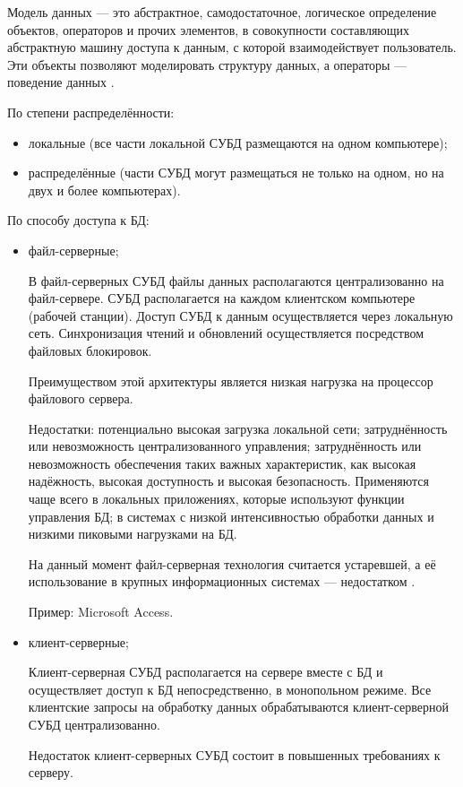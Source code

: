 Модель данных — это абстрактное, самодостаточное, логическое определение объектов, операторов и прочих элементов, в совокупности составляющих абстрактную машину доступа к данным, с которой взаимодействует пользователь. Эти объекты позволяют моделировать структуру данных, а операторы — поведение данных \cite{data_model}.

По степени распределённости:
\begin{itemize}
	\item локальные (все части локальной СУБД размещаются на одном компьютере);
	\item распределённые (части СУБД могут размещаться не только на одном, но на двух и более компьютерах).
\end{itemize}

По способу доступа к БД:
\begin{itemize}
	\item файл-серверные;
	
	В файл-серверных СУБД файлы данных располагаются централизованно на файл-сервере. СУБД располагается на каждом клиентском компьютере (рабочей станции). Доступ СУБД к данным осуществляется через локальную сеть. Синхронизация чтений и обновлений осуществляется посредством файловых блокировок.
	
	Преимуществом этой архитектуры является низкая нагрузка на процессор файлового сервера.
	
	Недостатки: потенциально высокая загрузка локальной сети; затруднённость или невозможность централизованного управления; затруднённость или невозможность обеспечения таких важных характеристик, как высокая надёжность, высокая доступность и высокая безопасность. Применяются чаще всего в локальных приложениях, которые используют функции управления БД; в системах с низкой интенсивностью обработки данных и низкими пиковыми нагрузками на БД.
	
	На данный момент файл-серверная технология считается устаревшей, а её использование в крупных информационных системах — недостатком  \cite{file_server}.
	
	Пример: Microsoft Access.
	
	\item клиент-серверные;
	
	Клиент-серверная СУБД располагается на сервере вместе с БД и осуществляет доступ к БД непосредственно, в монопольном режиме. Все клиентские запросы на обработку данных обрабатываются клиент-серверной СУБД централизованно.
	
	Недостаток клиент-серверных СУБД состоит в повышенных требованиях к серверу.
	

\end{itemize}

